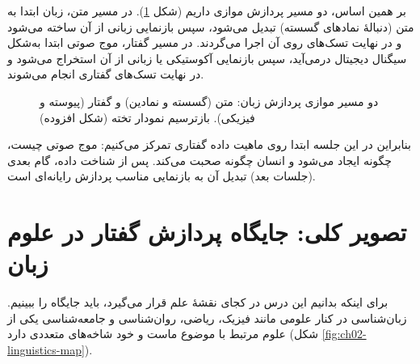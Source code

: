 بر همین اساس، دو مسیر پردازش موازی داریم (شکل \ref{fig:ch02-pipelines}). در مسیر متن، زبان ابتدا به متن (دنبالهٔ نمادهای گسسته) تبدیل می‌شود، سپس بازنمایی زبانی از آن ساخته می‌شود و در نهایت تسک‌های  روی آن اجرا می‌گردند. در مسیر گفتار، موج صوتی ابتدا به‌شکل سیگنال دیجیتال درمی‌آید، سپس بازنمایی آکوستیکی یا زبانی از آن استخراج می‌شود و در نهایت تسک‌های گفتاری انجام می‌شوند.

\begin{figure}[htbp]
\centering
{}
\caption{دو مسیر موازی پردازش زبان: متن (گسسته و نمادین) و گفتار (پیوسته و فیزیکی). بازترسیم نمودار تخته (شکل افزوده)}
\label{fig:ch02-pipelines}
\end{figure}

بنابراین در این جلسه ابتدا روی ماهیت داده گفتاری تمرکز می‌کنیم: موج صوتی چیست، چگونه ایجاد می‌شود و انسان چگونه صحبت می‌کند. پس از شناخت داده، گام بعدی (جلسات بعد) تبدیل آن به بازنمایی مناسب پردازش رایانه‌ای است.

\section{تصویر کلی: جایگاه پردازش گفتار در علوم زبان}

برای اینکه بدانیم این درس در کجای نقشهٔ علم قرار می‌گیرد، باید جایگاه  را ببینیم. زبان‌شناسی در کنار علومی مانند فیزیک، ریاضی، روان‌شناسی و جامعه‌شناسی یکی از علوم مرتبط با موضوع ماست و خود شاخه‌های متعددی دارد (شکل \ref{fig:ch02-linguistics-map}).

